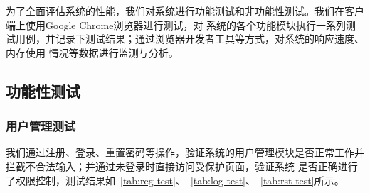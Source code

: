 为了全面评估系统的性能，我们对系统进行功能测试和非功能性测试。我们在客户端上使用Google Chrome浏览器进行测试，对
系统的各个功能模块执行一系列测试用例，并记录下测试结果；通过浏览器开发者工具等方式，对系统的响应速度、内存使用
情况等数据进行监测与分析。

\subsection{功能性测试}

\subsubsection{用户管理测试}

我们通过注册、登录、重置密码等操作，验证系统的用户管理模块是否正常工作并拦截不合法输入；并通过未登录时直接访问受保护页面，验证系统
是否正确进行了权限控制，测试结果如~\ref{tab:reg-test}、~\ref{tab:log-test}、~\ref{tab:rst-test}所示。

\begin{table}
    \centering
    \caption{注册测试}
    \label{tab:reg-test}
\end{table}

\begin{table}
    \centering
    \caption{登录测试}
    \label{tab:log-test}
\end{table}

